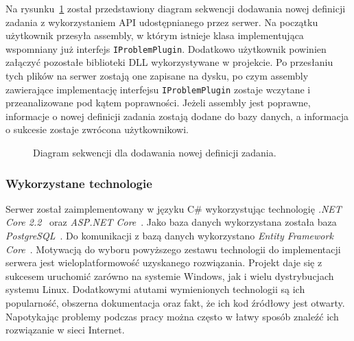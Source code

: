\documentclass[a4paper,11pt,twoside]{report}
\theoremstyle{definition}
\begin{document}
Na rysunku~\ref{task-definition-sequence-diagram} został przedstawiony diagram sekwencji dodawania nowej definicji zadania z wykorzystaniem API udostępnianego przez serwer. 
Na początku użytkownik przesyła assembly, w którym istnieje klasa implementująca wspomniany już interfejs \texttt{IProblemPlugin}.
Dodatkowo użytkownik powinien załączyć pozostałe biblioteki DLL wykorzystywane w projekcie.
Po przesłaniu tych plików na serwer zostają one zapisane na dysku, po czym assembly zawierające implementację interfejsu \texttt{IProblemPlugin} zostaje wczytane i przeanalizowane pod kątem poprawności.
Jeżeli assembly jest poprawne, informacje o nowej definicji zadania zostają dodane do bazy danych, a informacja o sukcesie zostaje zwrócona użytkownikowi.

\begin{figure} 
    \caption{Diagram sekwencji dla dodawania nowej definicji zadania.}
    \label{task-definition-sequence-diagram}
\end{figure}

\subsubsection{Wykorzystane technologie}
Serwer został zaimplementowany w języku C\# wykorzystując technologię \textit{.NET Core 2.2}~\cite{dotnet-core} oraz \textit{ASP.NET Core}~\cite{aspnet-core}. Jako baza danych wykorzystana została baza \textit{PostgreSQL}~\cite{postgresql}. Do komunikacji z bazą danych wykorzystano \textit{Entity Framework Core}~\cite{ef-core}. 
Motywacją do wyboru powyższego zestawu technologii do implementacji serwera jest wieloplatformowość uzyskanego rozwiązania. 
Projekt daje się z sukcesem uruchomić zarówno na systemie Windows, jak i wielu dystrybucjach systemu Linux. 
Dodatkowymi atutami wymienionych technologii są ich popularność, obszerna dokumentacja oraz fakt, że ich kod źródłowy jest otwarty. Napotykając problemy podczas pracy można często w łatwy sposób znaleźć ich rozwiązanie w sieci Internet.
\end{document}
